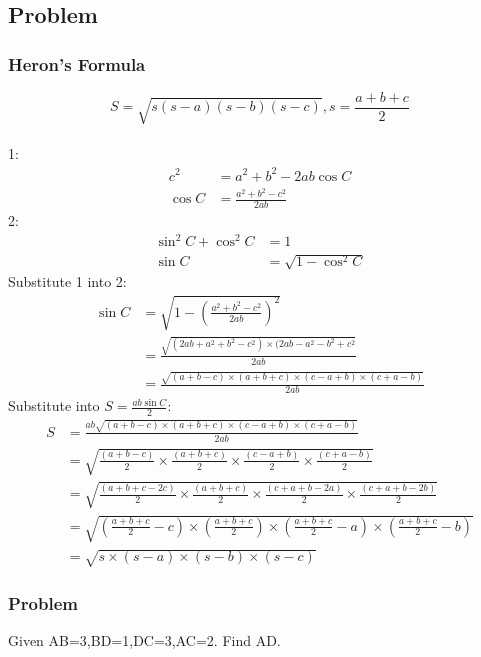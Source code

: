 \documentclass{article}
\begin{document}
\subsection{Problem}
\subsubsection{Heron's Formula}
$$S= \sqrt {s (s-a) (s-b) (s-c)}, s=\frac{a+b+c}{2}$$\\
1:
\begin{align*} 
c^2&=a^2+b^2-2ab\cos C\\
\cos C&=\frac{a^2+b^2-c^2}{2ab}
\end{align*}
2: 
\begin{align*}    
\sin ^2 C+\cos ^2 C&=1\\
\sin C&=\sqrt{1-\cos ^2 C}
\end{align*}
Substitute 1 into 2: 
\begin{align*} 
\sin C&=\sqrt{1-(\frac{a^2+b^2-c^2}{2ab})^2}\\
&=\frac{\sqrt{(2ab+a^2+b^2-c^2)\times (2ab-a^2-b^2+c^2}}{2ab}\\
&=\frac{\sqrt{(a+b-c)\times (a+b+c)\times (c-a+b)\times (c+a-b)}}{2ab}
\end{align*}
Substitute into $S=\frac{ab\sin C}{2}$:
\begin{align*}
    S&=\frac{ab\sqrt{(a+b-c)\times (a+b+c)\times (c-a+b)\times (c+a-b)}}{2ab}\\
    &=\sqrt{\frac{(a+b-c)}{2}\times \frac{(a+b+c)}{2}\times \frac{(c-a+b)}{2}\times \frac{(c+a-b)}{2}}\\
    &=\sqrt{\frac{(a+b+c-2c)}{2}\times \frac{(a+b+c)}{2}\times \frac{(c+a+b-2a)}{2}\times \frac{(c+a+b-2b)}{2}}\\
    &=\sqrt{(\frac{a+b+c}{2}-c)\times (\frac{a+b+c}{2})\times (\frac{a+b+c}{2}-a)\times (\frac{a+b+c}{2}-b)}\\
    &=\sqrt{s\times (s-a)\times(s-b)\times(s-c)}
\end{align*}
\pagebreak


\subsubsection{Problem}
Given AB=3,BD=1,DC=3,AC=2. Find AD.
\end{document}
